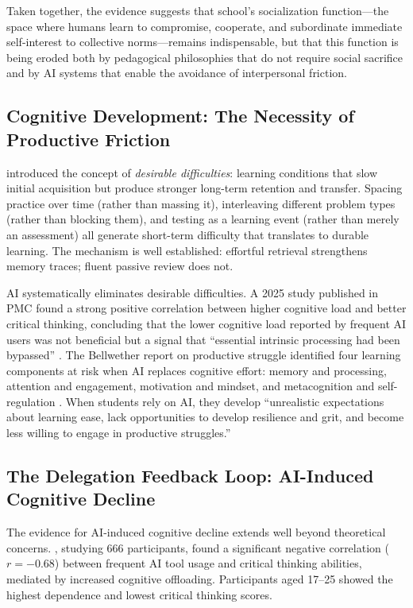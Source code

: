\documentclass[12pt]{article}
\begin{document}
Taken together, the evidence suggests that school's socialization function---the space where humans learn to compromise, cooperate, and subordinate immediate self-interest to collective norms---remains indispensable, but that this function is being eroded both by pedagogical philosophies that do not require social sacrifice and by AI systems that enable the avoidance of interpersonal friction.

\subsection{Cognitive Development: The Necessity of Productive Friction}
\label{sec:cognitive}

\citet{Bjork1994desirable} introduced the concept of \emph{desirable difficulties}: learning conditions that slow initial acquisition but produce stronger long-term retention and transfer. Spacing practice over time (rather than massing it), interleaving different problem types (rather than blocking them), and testing as a learning event (rather than merely an assessment) all generate short-term difficulty that translates to durable learning. The mechanism is well established: effortful retrieval strengthens memory traces; fluent passive review does not.

AI systematically eliminates desirable difficulties. A 2025 study published in PMC found a strong positive correlation between higher cognitive load and better critical thinking, concluding that the lower cognitive load reported by frequent AI users was not beneficial but a signal that ``essential intrinsic processing had been bypassed'' \citep{CognitiveParadox2025}. The Bellwether report on productive struggle identified four learning components at risk when AI replaces cognitive effort: memory and processing, attention and engagement, motivation and mindset, and metacognition and self-regulation \citep{Bellwether2025struggle}. When students rely on AI, they develop ``unrealistic expectations about learning ease, lack opportunities to develop resilience and grit, and become less willing to engage in productive struggles.''

\subsection{The Delegation Feedback Loop: AI-Induced Cognitive Decline}
\label{sec:delegation}

The evidence for AI-induced cognitive decline extends well beyond theoretical concerns. \citet{Gerlich2025offloading}, studying 666 participants, found a significant negative correlation ($r = -0.68$) between frequent AI tool usage and critical thinking abilities, mediated by increased cognitive offloading. Participants aged 17--25 showed the highest dependence and lowest critical thinking scores.
\end{document}
